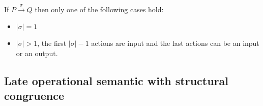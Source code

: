 \begin{lemma}\label{lemmastrongsequence}
  If $P\xrightarrow{\sigma} Q$ then only one of the following cases hold: 
  \begin{itemize}
    \item 
      $|\sigma|=1$
    \item
      $|\sigma|>1$, the first $|\sigma|-1$ actions are input and the last actions can be an input or an output.
  \end{itemize}
\end{lemma}



\subsection{Late operational semantic with structural congruence}

